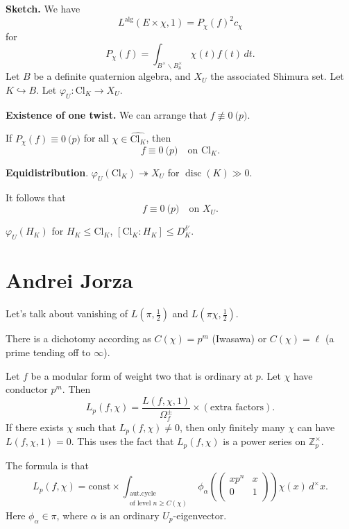 \documentclass[reqno]{amsart} 
\begin{document}
\textbf{Sketch.}  We have
\begin{equation*}
  L^{\mathrm{alg}}(E \times \chi, 1) = P_\chi(f)^2 c_\chi
\end{equation*}
for
\begin{equation*}
  P_\chi(f) = \int_{B^\times \backslash B^\times_{\mathbb{A}}} \chi(t) f(t) \, d t.
\end{equation*}
Let $B$ be a definite quaternion algebra, and $X_U$ the associated Shimura set.  Let $K \hookrightarrow B$.  Let $\varphi_U : \mathrm{Cl}_K \rightarrow X_U$.

\textbf{Existence of one twist.}  We can arrange that $f \not \equiv 0 \pod{p}$.

If $P_\chi(f) \equiv 0 \pod{p}$ for all $\chi \in \widehat{\mathrm{Cl}_K}$, then
\begin{equation*}
  f \equiv 0 \pod{p} \quad \text{on } \mathrm{Cl}_K.
\end{equation*}

\textbf{Equidistribution}. $\varphi_U(\mathrm{Cl}_K) \twoheadrightarrow X_U$ for $\operatorname{disc}(K) \gg 0$.

It follows that
\begin{equation*}
  f \equiv 0 \pod{p}\quad \text{on } X_U.
\end{equation*}

$\varphi_U(H_K)$ for $H_K \leq \mathrm{Cl}_K$, $[\mathrm{Cl}_K : H_K] \leq D_K^{\delta '}$.

\section{Andrei Jorza}
Let's talk about vanishing of $L(\pi, \tfrac{1}{2})$ and $L(\pi \chi, \tfrac{1}{2})$.

There is a dichotomy according as $C(\chi) = p^m$ (Iwasawa) or $C(\chi) = \ell$ (a prime tending off to $\infty$).

Let $f$ be a modular form of weight two that is ordinary at $p$.  Let $\chi$ have conductor $p^m$.  Then
\begin{equation*}
  L_p(f, \chi) = \frac{L(f, \chi, 1)}{\Omega_f^{\pm}}
  \times(\text{extra factors}).
\end{equation*}
If there exists $\chi$ such that $L_p(f, \chi) \neq 0$, then only finitely many $\chi$ can have $L(f, \chi, 1) = 0$.  This uses the fact that $L_p(f, \chi)$ is a power series on $\mathbb{Z}_p^\times$.

The formula is that
\begin{equation*}
  L_p(f, \chi) = \mathrm{const} \times \int_{
    \substack{
      \mathrm{aut. cycle}  \\
      \text{of level } n \geq C(\chi)
    }
  } \phi_\alpha \left(
    \begin{pmatrix}
      x p^n  & x \\
      0 & 1 \\
    \end{pmatrix} \right) \chi(x) \,d^\times x.
\end{equation*}
Here $\phi_\alpha \in \pi$, where $\alpha$ is an ordinary $U_p$-eigenvector.
\end{document}
